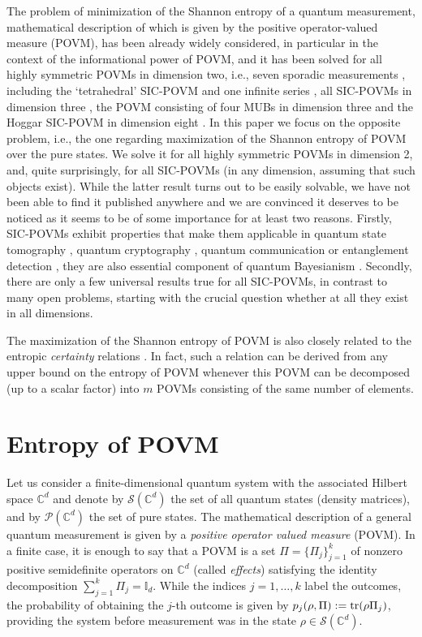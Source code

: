 \documentclass[11pt]{article}
\theoremstyle{remark}
\theoremstyle{definition}
\def\tr{\textnormal{tr}}
\begin{document}
The problem of minimization of the Shannon entropy of a quantum measurement, mathematical description of which is given by the positive operator-valued measure (POVM), has been already widely considered, in particular in the context of the informational power of POVM, and it has been solved for all highly symmetric POVMs in dimension two, i.e., seven sporadic measurements \cite{SloSzy16}, including the `tetrahedral' SIC-POVM \cite{DAretal11,Oreetal11} and one infinite series \cite{SloSzy16,DAretal11}, all SIC-POVMs in dimension three \cite{Szy14}, the POVM consisting of four MUBs in dimension three \cite{DAr14} and the Hoggar SIC-POVM in dimension eight \cite{SzySlo16}. In this paper we focus on the opposite problem, i.e., the one regarding maximization of the Shannon entropy of POVM over the pure states. We solve it for all highly symmetric POVMs in dimension 2, and, quite surprisingly, for all SIC-POVMs (in any dimension, assuming that such objects exist). While the  latter result turns out to be easily solvable, we have not been able to find it published anywhere and we are convinced it deserves to be noticed as it seems to be of some importance for at least two reasons. Firstly, SIC-POVMs exhibit properties that make them applicable in quantum state tomography \cite{Sco06,ZhuEng11,JiaPhd,Benetal15}, quantum cryptography \cite{Ren05}, quantum communication \cite{Oreetal11} or entanglement detection \cite{Cheetal15}, they are also essential component of quantum Bayesianism \cite{Cavetal02}. Secondly, there are only a few universal results true for all SIC-POVMs, in contrast to many open problems, starting with the crucial question whether at all they exist in all dimensions.


The maximization of the Shannon entropy of POVM is also closely related to the entropic \emph{certainty} relations \cite{San95,Pucetal15}. In fact, such a relation can be derived from any upper bound on the entropy of POVM  whenever this POVM can be decomposed (up to a scalar factor) into $m$ POVMs consisting of the same number of elements.



\section{Entropy of POVM}

Let us consider a finite-dimensional quantum system with the associated Hilbert space $\mathbb C^d$ and denote by $\mathcal S(\mathbb C^d)$ the set of all quantum states (density matrices), and by $\mathcal P(\mathbb C^d)$ the set of pure states. The mathematical description of a general quantum measurement is given by a \emph{positive operator valued measure} (POVM). In a finite case, it is enough to say that a POVM is a set $\Pi=\{\Pi_j\}_{j=1}^k$ of nonzero positive semidefinite operators on $\mathbb C^d$ (called \emph{effects}) satisfying the identity decomposition $\sum_{j=1}^k\Pi_j=\mathbb I_d$. While the indices $j=1,\ldots,k$ label the outcomes, the probability of obtaining the $j$-th outcome is given by $p_j(\rho,\Pi):=\tr(\rho\Pi_j)$, providing the system before measurement was in the state $\rho\in\mathcal S(\mathbb C^d)$. 
\end{document}
